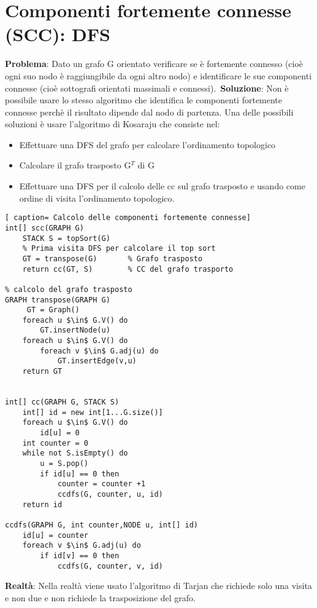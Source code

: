 \documentclass[../cheatSheetAlgoritmi.tex]{subfiles}
\begin{document}
\section{Componenti fortemente connesse (SCC): DFS}
\textbf{Problema}: Dato un grafo G orientato verificare se è fortemente connesso (cioè  ogni suo nodo è raggiungibile da ogni altro nodo) e identificare le sue componenti connesse (cioè sottografi orientati massimali e connessi).\
\textbf{Soluzione}: Non è possibile usare lo stesso algoritmo che identifica le componenti fortemente connesse perchè il risultato dipende dal nodo di partenza. Una delle possibili soluzioni è usare l'algoritmo di Kosaraju che consiste nel:
\begin{itemize}
	\item Effettuare una DFS del grafo per calcolare l'ordinamento topologico
	\item Calcolare il grafo trasposto G$^{T}$ di G
	\item Effettuare una DFS per il calcolo delle cc sul grafo trasposto e usando come ordine di visita l'ordinamento topologico. 
\end{itemize} 
 
\begin{lstlisting}[ caption= Calcolo delle componenti fortemente connesse]
int[] scc(GRAPH G)
	STACK S = topSort(G) 	
	% Prima visita DFS per calcolare il top sort
	GT = transpose(G)		% Grafo trasposto
	return cc(GT, S)		% CC del grafo trasporto
	
% calcolo del grafo trasposto
GRAPH transpose(GRAPH G)
	 GT = Graph()
	foreach u $\in$ G.V() do
		GT.insertNode(u)
	foreach u $\in$ G.V() do
		foreach v $\in$ G.adj(u) do
			GT.insertEdge(v,u)
	return GT


int[] cc(GRAPH G, STACK S)
	int[] id = new int[1...G.size()]
	foreach u $\in$ G.V() do
		id[u] = 0
	int counter = 0
	while not S.isEmpty() do
		u = S.pop()
		if id[u] == 0 then
			counter = counter +1
			ccdfs(G, counter, u, id)
	return id
	
ccdfs(GRAPH G, int counter,NODE u, int[] id)
	id[u] = counter
	foreach v $\in$ G.adj(u) do
		if id[v] == 0 then
			ccdfs(G, counter, v, id)
\end{lstlisting}
\textbf{Realtà}: Nella realtà viene usato l'algoritmo di Tarjan che richiede solo una visita e non due e non richiede la trasposizione del grafo.

 
\end{document}
